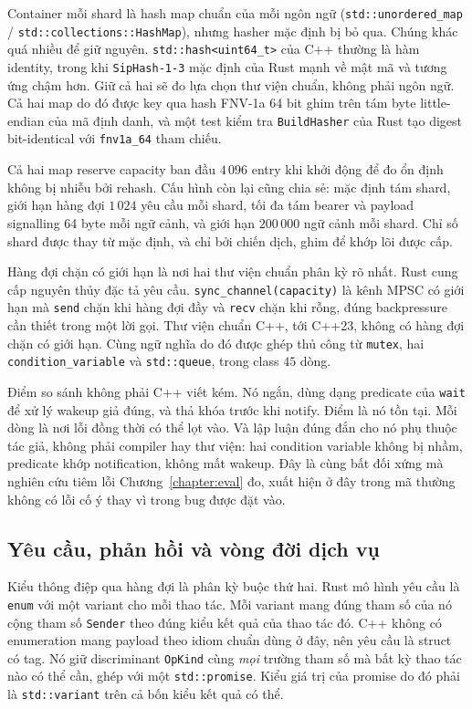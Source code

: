 Container mỗi shard là hash map chuẩn của mỗi ngôn ngữ (\texttt{std::unordered\_map} /
\texttt{std::collections::HashMap}), nhưng hasher mặc định bị bỏ qua. Chúng khác quá nhiều
để giữ nguyên. \texttt{std::hash<uint64\_t>} của C++ thường là hàm identity, trong khi
\texttt{SipHash-1-3} mặc định của Rust mạnh về mật mã và tương ứng chậm hơn.
Giữ cả hai sẽ đo lựa chọn thư viện chuẩn, không phải ngôn ngữ. Cả hai map do đó
được key qua hash FNV-1a 64 bit ghim trên tám byte little-endian của
mã định danh, và một test kiểm tra \texttt{BuildHasher} của Rust tạo digest bit-identical
với \texttt{fnv1a\_64} tham chiếu.

Cả hai map reserve capacity ban đầu $4\,096$ entry khi khởi động để đo ổn định
không bị nhiễu bởi rehash. Cấu hình còn lại cũng chia sẻ:
mặc định tám shard, giới hạn hàng đợi
$1\,024$ yêu cầu mỗi shard, tối đa tám bearer và payload signalling 64 byte mỗi
ngữ cảnh, và giới hạn $200\,000$ ngữ cảnh mỗi shard. Chỉ số shard được thay từ
mặc định, và chỉ bởi chiến dịch, ghim để khớp lõi được cấp.

Hàng đợi chặn có giới hạn là nơi hai thư viện chuẩn phân kỳ rõ nhất. Rust
cung cấp nguyên thủy đặc tả yêu cầu. \texttt{sync\_channel(capacity)} là
kênh MPSC có giới hạn mà \texttt{send} chặn khi hàng đợi đầy và \texttt{recv} chặn khi rỗng, đúng
backpressure cần thiết trong một lời gọi. Thư viện chuẩn C++, tới C++23, không có
hàng đợi chặn có giới hạn. Cùng ngữ nghĩa do đó được ghép thủ công từ
\texttt{mutex}, hai \texttt{condition\_variable} và \texttt{std::queue}, trong class $45$
dòng.

Điểm so sánh không phải C++ viết kém. Nó ngắn, dùng
dạng predicate của \texttt{wait} để xử lý wakeup giả đúng, và
thả khóa trước khi notify. Điểm là nó tồn tại. Mỗi dòng
là nơi lỗi đồng thời có thể lọt vào. Và lập luận đúng đắn cho nó phụ thuộc
tác giả, không phải compiler hay thư viện: hai condition variable không bị nhầm,
predicate khớp notification, không mất wakeup. Đây là
cùng bất đối xứng mà nghiên cứu tiêm lỗi Chương~\ref{chapter:eval} đo, xuất hiện ở đây
trong mã thường không có lỗi cố ý thay vì trong bug được đặt vào.

\subsection{Yêu cầu, phản hồi và vòng đời dịch vụ}\label{sec:tagged}
\label{sec:request}
Kiểu thông điệp qua hàng đợi là phân kỳ buộc thứ hai. Rust mô hình
yêu cầu là \texttt{enum} với một variant cho mỗi
thao tác. Mỗi variant mang đúng tham số của nó cộng tham số \texttt{Sender}
theo đúng kiểu kết quả của thao tác đó. C++ không có enumeration mang payload
theo idiom chuẩn dùng ở đây, nên yêu cầu là struct có tag. Nó giữ
discriminant \texttt{OpKind} cùng \emph{mọi} trường tham số mà bất kỳ thao tác nào có thể cần,
ghép với một \texttt{std::promise}. Kiểu giá trị của promise do đó phải là
\texttt{std::variant} trên cả bốn kiểu kết quả có thể.

